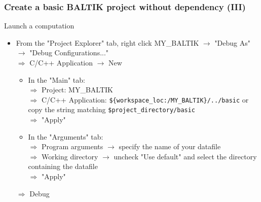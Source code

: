 \documentclass[10pt, hyperref={unicode=true,pdfusetitle, bookmarks=true,bookmarksnumbered=false,bookmarksopen=false, breaklinks=false,pdfborder={0 0 1},backref=true,colorlinks=true,linkcolor=darkblue,pageanchor, urlcolor=darkblue}]{beamer}
\begin{document}
\begin{frame}
\frametitle{Create a basic BALTIK project without dependency (III)}

\begin{block}{Launch a computation}
\begin{itemize}
\item From the "Project Explorer" tab, right click MY\_BALTIK $\rightarrow$ "Debug As" $\rightarrow$ "Debug Configurations..." \\
  $\Rightarrow$ C/C++ Application $\rightarrow$ New 
  \begin{itemize}
  \item In the "Main" tab:\\
  $\Rightarrow$ Project: MY\_BALTIK \\
  $\Rightarrow$ C/C++ Application: \texttt{\$\{workspace\_loc:/MY\_BALTIK\}/../basic} or copy the string matching \texttt{\$project\_directory/basic} \\
  $\Rightarrow$ "Apply" 
  \item In the "Arguments" tab:\\
  $\Rightarrow$ Program arguments $\rightarrow$ specify the name of your datafile \\
  $\Rightarrow$ Working directory $\rightarrow$ uncheck "Use default" and select the  directory containing the datafile \\
  $\Rightarrow$ "Apply"
  \end{itemize}
  $\Rightarrow$ Debug
\end{itemize}
\end{block}

\end{frame}


\end{document}
